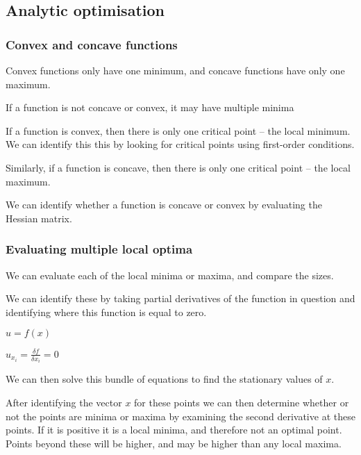 
\subsection{Analytic optimisation}

\subsubsection{Convex and concave functions}

Convex functions only have one minimum, and concave functions have only one maximum.

If a function is not concave or convex, it may have multiple minima

If a function is convex, then there is only one critical point – the local minimum. We can identify this this by looking for critical points using first-order conditions.

Similarly, if a function is concave, then there is only one critical point – the local maximum.

We can identify whether a function is concave or convex by evaluating the Hessian matrix.

\subsubsection{Evaluating multiple local optima}

We can evaluate each of the local minima or maxima, and compare the sizes.

We can identify these by taking partial derivatives of the function in question and identifying where this function is equal to zero.

\(u=f(x)\)

\(u_{x_i}=\frac{\delta f}{\delta x_i}=0\)

We can then solve this bundle of equations to find the stationary values of \(x\).

After identifying the vector \(x\) for these points we can then  determine whether or not the points are minima or maxima by  examining the second derivative at these points. If it is positive it is a local minima, and therefore not an optimal point. Points beyond these will be higher, and may be higher than any local maxima.


